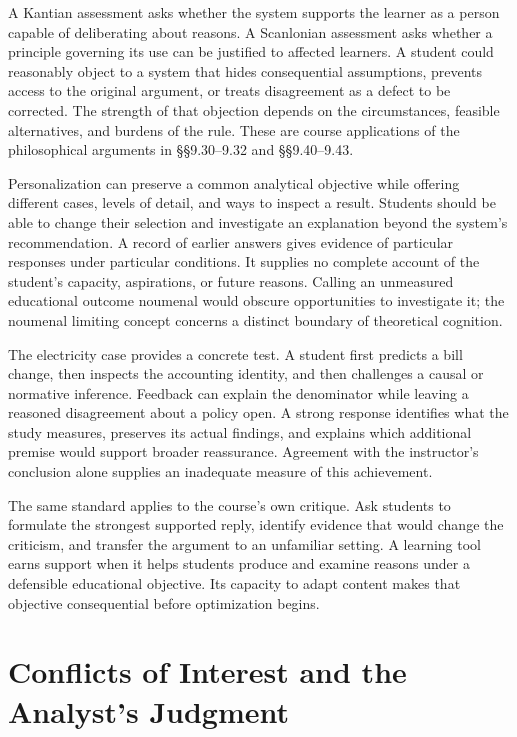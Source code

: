A Kantian assessment asks whether the system supports the learner as a
person capable of deliberating about reasons. A Scanlonian assessment
asks whether a principle governing its use can be justified to affected
learners. A student could reasonably object to a system that hides
consequential assumptions, prevents access to the original argument, or
treats disagreement as a defect to be corrected. The strength of that
objection depends on the circumstances, feasible alternatives, and
burdens of the rule. These are course applications of the philosophical
arguments in §§9.30--9.32 and §§9.40--9.43.

Personalization can preserve a common analytical objective while
offering different cases, levels of detail, and ways to inspect a
result. Students should be able to change their selection and
investigate an explanation beyond the system's recommendation. A record
of earlier answers gives evidence of particular responses under
particular conditions. It supplies no complete account of the student's
capacity, aspirations, or future reasons. Calling an unmeasured
educational outcome noumenal would obscure opportunities to investigate
it; the noumenal limiting concept concerns a distinct boundary of
theoretical cognition.

The electricity case provides a concrete test. A student first predicts
a bill change, then inspects the accounting identity, and then
challenges a causal or normative inference. Feedback can explain the
denominator while leaving a reasoned disagreement about a policy open. A
strong response identifies what the study measures, preserves its actual
findings, and explains which additional premise would support broader
reassurance. Agreement with the instructor's conclusion alone supplies
an inadequate measure of this achievement.

The same standard applies to the course's own critique. Ask students to
formulate the strongest supported reply, identify evidence that would
change the criticism, and transfer the argument to an unfamiliar
setting. A learning tool earns support when it helps students produce
and examine reasons under a defensible educational objective. Its
capacity to adapt content makes that objective consequential before
optimization begins.


\hypertarget{M09-conflicts-of-interest-and-the-analysts-judgment}{%
\section{Conflicts of Interest and the Analyst's
Judgment}\label{M09-conflicts-of-interest-and-the-analysts-judgment}}

